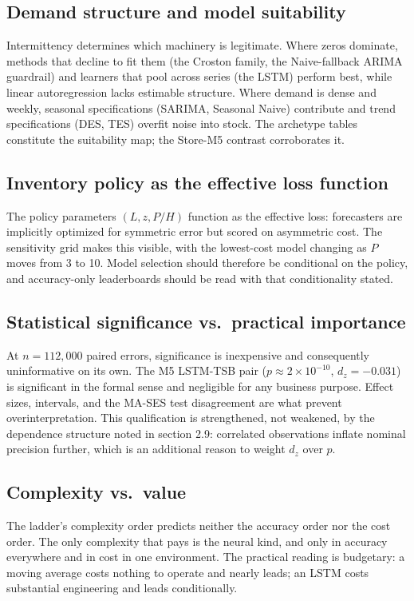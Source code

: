 \subsection{Demand structure and model suitability}
\label{sec:d-structure}
Intermittency determines which machinery is legitimate. Where zeros
dominate, methods that decline to fit them (the Croston family, the
Naive-fallback ARIMA guardrail) and learners that pool across series (the
LSTM) perform best, while linear autoregression lacks estimable structure.
Where demand is dense and weekly, seasonal specifications (SARIMA, Seasonal
Naive) contribute and trend specifications (DES, TES) overfit noise into
stock. The archetype tables constitute the suitability map; the Store-M5
contrast corroborates it.

\subsection{Inventory policy as the effective loss function}
\label{sec:d-policy-loss}
The policy parameters $(L, z, P/H)$ function as the effective loss: forecasters
are implicitly optimized for symmetric error but scored on asymmetric cost.
The sensitivity grid makes this visible, with the lowest-cost model changing
as $P$ moves from 3 to 10. Model selection should therefore be conditional on
the policy, and accuracy-only leaderboards should be read with that
conditionality stated.

\subsection{Statistical significance vs.\ practical importance}
\label{sec:d-sig}
At $n=112{,}000$ paired errors, significance is inexpensive and consequently
uninformative on its own. The M5 LSTM-TSB pair ($p \approx 2\times 10^{-10}$,
$d_z=-0.031$) is significant in the formal sense and negligible for any
business purpose. Effect sizes, intervals, and the MA-SES test disagreement
are what prevent overinterpretation. This qualification is strengthened, not
weakened, by the dependence structure noted in section 2.9:
correlated observations inflate nominal precision further, which is an
additional reason to weight $d_z$ over $p$.

\subsection{Complexity vs.\ value}
\label{sec:d-complex}
The ladder's complexity order predicts neither the accuracy order nor the
cost order. The only complexity that pays is the neural kind, and only in
accuracy everywhere and in cost in one environment. The practical reading is
budgetary: a moving average costs nothing to operate and nearly leads; an
LSTM costs substantial engineering and leads conditionally.

